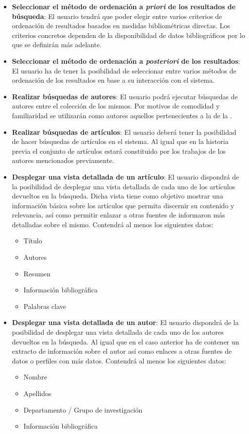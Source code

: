 \begin{itemize}
	\item \textbf{Seleccionar el método de ordenación a \textit{priori} de los resultados de búsqueda}: El usuario tendrá que poder elegir entre varios criterios de ordenación de resultados basados en medidas bibliométricas directas. Los criterios concretos dependen de la disponibilidad de datos bibliográficos por lo que se definirán más adelante.
	
	\item \textbf{Seleccionar el método de ordenación a \textit{posteriori} de los resultados}: El usuario ha de tener la posibilidad de seleccionar entre varios métodos de ordenación de los resultados en base a su interacción con el sistema.

	\item \textbf{Realizar búsquedas de autores}: El usuario podrá ejecutar búsquedas de autores entre el colección de los mismos. Por motivos de comodidad y familiaridad se utilizarán como autores aquellos pertenecientes a la \myFaculty de la \myUni.
	
	\item \textbf{Realizar búsquedas de artículos}: El usuario deberá tener la posibilidad de hacer búsquedas de artículos en el sistema. Al igual que en la historia previa el conjunto de artículos estará constituido por los trabajos de los autores mencionados previamente.
	
	\item \textbf{Desplegar una vista detallada de un artículo}: El usuario dispondrá de la posibilidad de desplegar una vista detallada de cada uno de los artículos devueltos en la búsqueda. Dicha vista tiene como objetivo mostrar una información básica sobre los artículos que permita discernir su contenido y relevancia, así como permitir enlazar a otras fuentes de informaron más detalladas sobre el mismo. Contendrá al menos los siguientes datos:
	\begin{itemize}
		\item[\textendash] Título
		\item[\textendash] Autores
		\item[\textendash] Resumen
		\item[\textendash] Información bibliográfica
		\item[\textendash] Palabras clave
	\end{itemize}
	
	\item \textbf{Desplegar una vista detallada de un autor}:  El usuario dispondrá de la posibilidad de desplegar una vista detallada de cada uno de los autores devueltos en la búsqueda. Al igual que en el caso anterior ha de contener un extracto de información sobre el autor así como enlaces a otras fuentes de datos o perfiles con más datos. Contendrá al menos los siguientes datos:
	\begin{itemize}
		\item[\textendash] Nombre
		\item[\textendash] Apellidos
		\item[\textendash] Departamento / Grupo de investigación
		\item[\textendash] Información bibliográfica


\end{itemize}
\end{itemize}

